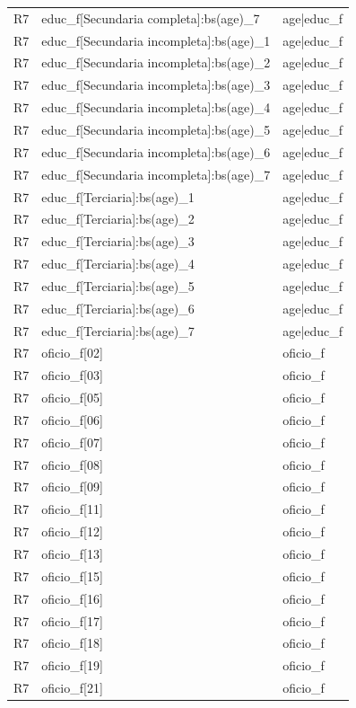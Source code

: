 \begin{longtable}{lll}
R7 & educ\_f[Secundaria completa]:bs(age)\_7 & age|educ\_f \\
R7 & educ\_f[Secundaria incompleta]:bs(age)\_1 & age|educ\_f \\
R7 & educ\_f[Secundaria incompleta]:bs(age)\_2 & age|educ\_f \\
R7 & educ\_f[Secundaria incompleta]:bs(age)\_3 & age|educ\_f \\
R7 & educ\_f[Secundaria incompleta]:bs(age)\_4 & age|educ\_f \\
R7 & educ\_f[Secundaria incompleta]:bs(age)\_5 & age|educ\_f \\
R7 & educ\_f[Secundaria incompleta]:bs(age)\_6 & age|educ\_f \\
R7 & educ\_f[Secundaria incompleta]:bs(age)\_7 & age|educ\_f \\
R7 & educ\_f[Terciaria]:bs(age)\_1 & age|educ\_f \\
R7 & educ\_f[Terciaria]:bs(age)\_2 & age|educ\_f \\
R7 & educ\_f[Terciaria]:bs(age)\_3 & age|educ\_f \\
R7 & educ\_f[Terciaria]:bs(age)\_4 & age|educ\_f \\
R7 & educ\_f[Terciaria]:bs(age)\_5 & age|educ\_f \\
R7 & educ\_f[Terciaria]:bs(age)\_6 & age|educ\_f \\
R7 & educ\_f[Terciaria]:bs(age)\_7 & age|educ\_f \\
R7 & oficio\_f[02] & oficio\_f \\
R7 & oficio\_f[03] & oficio\_f \\
R7 & oficio\_f[05] & oficio\_f \\
R7 & oficio\_f[06] & oficio\_f \\
R7 & oficio\_f[07] & oficio\_f \\
R7 & oficio\_f[08] & oficio\_f \\
R7 & oficio\_f[09] & oficio\_f \\
R7 & oficio\_f[11] & oficio\_f \\
R7 & oficio\_f[12] & oficio\_f \\
R7 & oficio\_f[13] & oficio\_f \\
R7 & oficio\_f[15] & oficio\_f \\
R7 & oficio\_f[16] & oficio\_f \\
R7 & oficio\_f[17] & oficio\_f \\
R7 & oficio\_f[18] & oficio\_f \\
R7 & oficio\_f[19] & oficio\_f \\
R7 & oficio\_f[21] & oficio\_f \\

\end{longtable}
